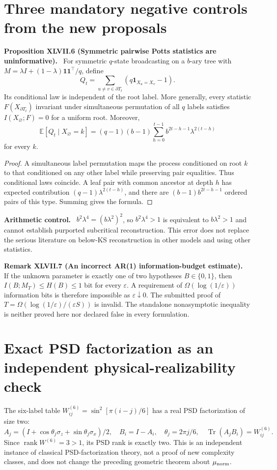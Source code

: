 \documentclass[11pt,a4paper,oneside]{book}
\newcommand{\one}{\mathbf 1}\newcommand{\ii}{\mathrm i}\newcommand{\dd}{\mathrm d}
\DeclareMathOperator{\rank}{rank}\DeclareMathOperator{\Tr}{Tr}
\newcommand{\statement}[3]{\par\medskip\noindent\textbf{#1 #2 (#3).}\ }
\newcommand{\note}[1]{\par\medskip\noindent\textbf{#1}\ }
\begin{document}
\section{Three mandatory negative controls from the new proposals}
\statement{Proposition}{XLVII.6}{Symmetric pairwise Potts statistics are uninformative}
For symmetric $q$-state broadcasting on a $b$-ary tree with $M=\lambda I+(1-\lambda)\one\one^\top/q$, define
\[Q_t=\sum_{u\ne v\in\partial T_t}(q\one_{X_u=X_v}-1).\]
Its conditional law is independent of the root label. More generally, every statistic $F(X_{\partial T_t})$ invariant under simultaneous permutation of all $q$ labels satisfies $I(X_\varnothing;F)=0$ for a uniform root. Moreover,
\[\mathbb E[Q_t\mid X_\varnothing=k]=(q-1)(b-1)\sum_{h=0}^{t-1}b^{2t-h-1}\lambda^{2(t-h)}\]
for every $k$.
\begin{proof}
A simultaneous label permutation maps the process conditioned on root $k$ to that conditioned on any other label while preserving pair equalities. Thus conditional laws coincide. A leaf pair with common ancestor at depth $h$ has expected contribution $(q-1)\lambda^{2(t-h)}$, and there are $(b-1)b^{2t-h-1}$ ordered pairs of this type. Summing gives the formula.
\end{proof}
\note{Arithmetic control.} $b^2\lambda^4=(b\lambda^2)^2$, so $b^2\lambda^4>1$ is equivalent to $b\lambda^2>1$ and cannot establish purported subcritical reconstruction. This error does not replace the serious literature on below-KS reconstruction in other models and using other statistics.
\statement{Remark}{XLVII.7}{An incorrect AR(1) information-budget estimate}
If the unknown parameter is exactly one of two hypotheses $B\in\{0,1\}$, then $I(B;M_T)\le H(B)\le1$ bit for every $\varepsilon$. A requirement of $\Omega(\log(1/\varepsilon))$ information bits is therefore impossible as $\varepsilon\downarrow0$. The submitted proof of $T=\Omega(\log(1/\varepsilon)/(\varepsilon S))$ is invalid. The standalone nonasymptotic inequality is neither proved here nor declared false in every formulation.
\section{Exact PSD factorization as an independent physical-realizability check}
The six-label table $W^{(6)}_{ij}=\sin^2[\pi(i-j)/6]$ has a real PSD factorization of size two:
\[A_j=(I+\cos\theta_j\sigma_z+\sin\theta_j\sigma_x)/2,\quad B_i=I-A_i,\quad\theta_j=2\pi j/6,\quad\Tr(A_jB_i)=W^{(6)}_{ij}.\]
Since $\rank W^{(6)}=3>1$, its PSD rank is exactly two. This is an independent instance of classical PSD-factorization theory, not a proof of new complexity classes, and does not change the preceding geometric theorem about $\mu_{\rm norm}$.
\end{document}
